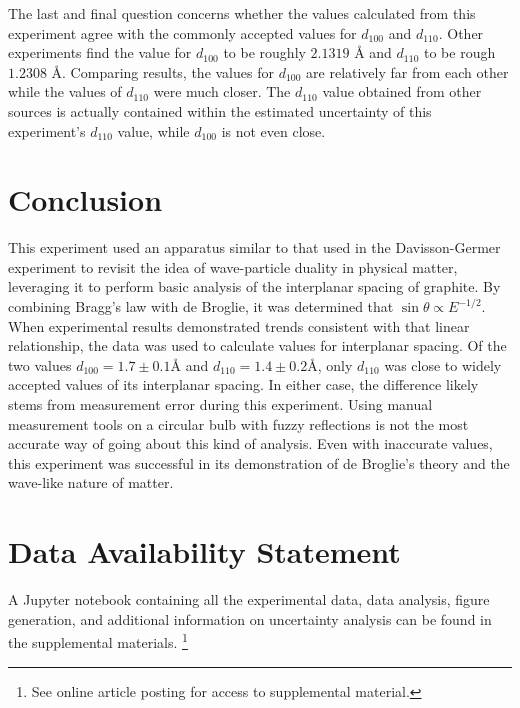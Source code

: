 \documentclass[rc,ec]{physicsinprogress}
\begin{document}
The last and final question concerns whether the values calculated from this experiment agree with the commonly accepted values for $d_{100}$ and $d_{110}$. Other experiments find the value for $d_{100}$ to be roughly $2.1319 \text{ Å}$   and $d_{110}$ to be rough $1.2308  \text{ Å}$\cite{Howe2003}. Comparing results, the values for $d_{100}$ are relatively far from each other while the values of $d_{110}$ were much closer. The $d_{110}$ value obtained from other sources is actually contained within the estimated uncertainty of this experiment's $d_{110}$ value, while $d_{100}$ is not even close.

\section{Conclusion}

This experiment used an apparatus similar to that used in the Davisson-Germer experiment to revisit the idea of wave-particle duality in physical matter, leveraging it to perform basic analysis of the interplanar spacing of graphite. By combining Bragg's law with de Broglie, it was determined that $\sin\theta \propto E^{-1/2}$. When experimental results demonstrated trends consistent with that linear relationship, the data was used to calculate values for interplanar spacing. Of the two values  $d_{100}=1.7 \pm 0.1 \text{Å} $ and  $d_{110}= 1.4\pm 0.2\text{Å}$, only $d_{110}$ was close to widely accepted values of its interplanar spacing. In either case, the difference likely stems from measurement error during this experiment. Using manual measurement tools on a circular bulb with fuzzy reflections is not the most accurate way of going about this kind of analysis. Even with inaccurate values, this experiment was successful in its demonstration of de Broglie's theory and the wave-like nature of matter. 

\section*{Data Availability Statement}
A Jupyter notebook containing all the experimental data, data analysis, figure generation, and additional information on uncertainty analysis can be found in the supplemental materials. \footnote{See online article posting for access to supplemental material.}



\end{document}
